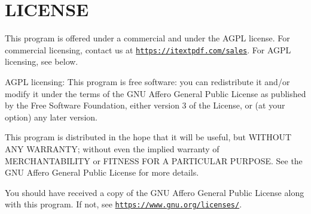 \chapter{LICENSE }
\hypertarget{md_packages_2itext_89_82_80_2_l_i_c_e_n_s_e}{}\label{md_packages_2itext_89_82_80_2_l_i_c_e_n_s_e}
This program is offered under a commercial and under the AGPL license. For commercial licensing, contact us at \href{https://itextpdf.com/sales}{\texttt{https\+://itextpdf.\+com/sales}}. For AGPL licensing, see below.

AGPL licensing\+: This program is free software\+: you can redistribute it and/or modify it under the terms of the GNU Affero General Public License as published by the Free Software Foundation, either version 3 of the License, or (at your option) any later version.

This program is distributed in the hope that it will be useful, but WITHOUT ANY WARRANTY; without even the implied warranty of MERCHANTABILITY or FITNESS FOR A PARTICULAR PURPOSE. See the GNU Affero General Public License for more details.

You should have received a copy of the GNU Affero General Public License along with this program. If not, see \href{https://www.gnu.org/licenses/}{\texttt{https\+://www.\+gnu.\+org/licenses/}}. 